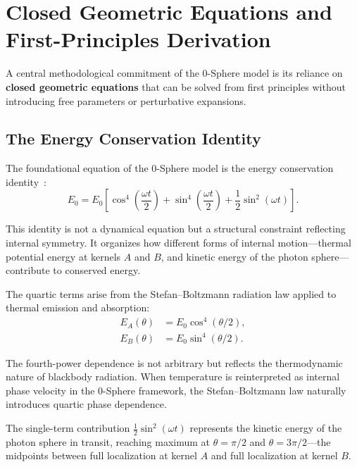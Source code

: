 \documentclass[12pt,letterpaper]{article}
\begin{document}
\section{Closed Geometric Equations and First-Principles Derivation}

A central methodological commitment of the 0-Sphere model is its reliance on \textbf{closed geometric equations} that can be solved from first principles without introducing free parameters or perturbative expansions.

\subsection{The Energy Conservation Identity}

The foundational equation of the 0-Sphere model is the energy conservation identity~\cite{hanamura17765017}:
\begin{equation}
E_0 = E_0 \left[
\cos^4\!\left(\frac{\omega t}{2}\right)
+ \sin^4\!\left(\frac{\omega t}{2}\right)
+ \frac{1}{2}\sin^2(\omega t)
\right].
\label{eq:energy_identity}
\end{equation}

This identity is not a dynamical equation but a structural constraint reflecting internal symmetry. It organizes how different forms of internal motion—thermal potential energy at kernels $A$ and $B$, and kinetic energy of the photon sphere—contribute to conserved energy.

The quartic terms arise from the Stefan--Boltzmann radiation law applied to thermal emission and absorption:
\begin{align}
E_A(\theta) &= E_0 \cos^4(\theta/2), \\
E_B(\theta) &= E_0 \sin^4(\theta/2).
\end{align}

The fourth-power dependence is not arbitrary but reflects the thermodynamic nature of blackbody radiation. When temperature is reinterpreted as internal phase velocity in the 0-Sphere framework, the Stefan--Boltzmann law naturally introduces quartic phase dependence.

The single-term contribution $\frac{1}{2}\sin^2(\omega t)$ represents the kinetic energy of the photon sphere in transit, reaching maximum at $\theta = \pi/2$ and $\theta = 3\pi/2$—the midpoints between full localization at kernel $A$ and full localization at kernel $B$.
\end{document}
